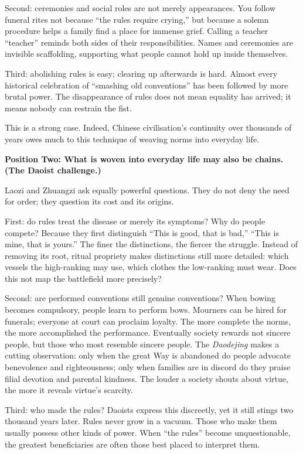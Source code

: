 Second: ceremonies and social roles are not merely appearances. You follow funeral rites not because ``the rules require crying,'' but because a solemn procedure helps a family find a place for immense grief. Calling a teacher ``teacher'' reminds both sides of their responsibilities. Names and ceremonies are invisible scaffolding, supporting what people cannot hold up inside themselves.

Third: abolishing rules is easy; clearing up afterwards is hard. Almost every historical celebration of ``smashing old conventions'' has been followed by more brutal power. The disappearance of rules does not mean equality has arrived; it means nobody can restrain the fist.

This is a strong case. Indeed, Chinese civilisation's continuity over thousands of years owes much to this technique of weaving norms into everyday life.

\textbf{Position Two: What is woven into everyday life may also be chains. (The Daoist challenge.)}

Laozi and Zhuangzi ask equally powerful questions. They do not deny the need for order; they question its cost and its origins.

First: do rules treat the disease or merely its symptoms? Why do people compete? Because they first distinguish ``This is good, that is bad,'' ``This is mine, that is yours.'' The finer the distinctions, the fiercer the struggle. Instead of removing its root, ritual propriety makes distinctions still more detailed: which vessels the high-ranking may use, which clothes the low-ranking must wear. Does this not map the battlefield more precisely?

Second: are performed conventions still genuine conventions? When bowing becomes compulsory, people learn to perform bows. Mourners can be hired for funerals; everyone at court can proclaim loyalty. The more complete the norms, the more accomplished the performance. Eventually society rewards not sincere people, but those who most resemble sincere people. The \textit{Daodejing} makes a cutting observation: only when the great Way is abandoned do people advocate benevolence and righteousness; only when families are in discord do they praise filial devotion and parental kindness. The louder a society shouts about virtue, the more it reveals virtue's scarcity.

Third: who made the rules? Daoists express this discreetly, yet it still stings two thousand years later. Rules never grow in a vacuum. Those who make them usually possess other kinds of power. When ``the rules'' become unquestionable, the greatest beneficiaries are often those best placed to interpret them.

